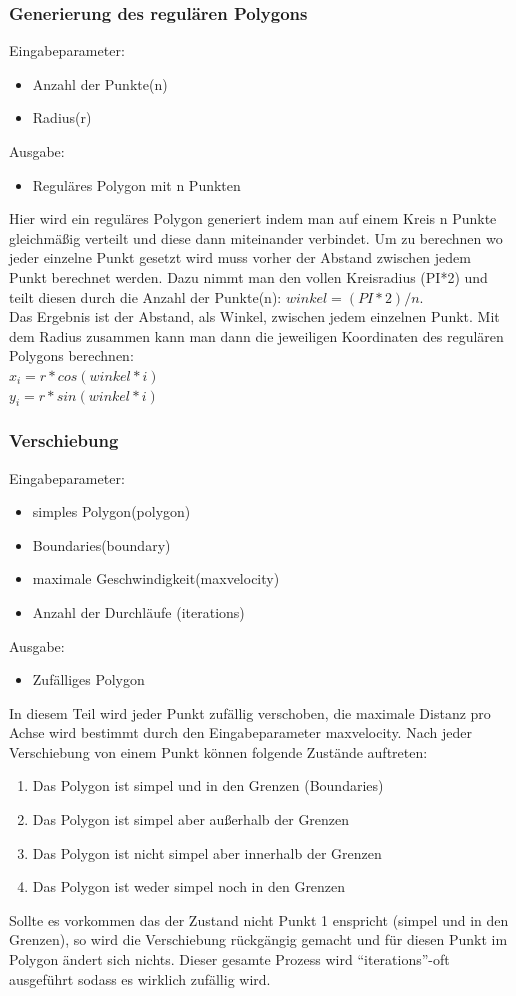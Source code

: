\subsubsection{Generierung des regulären Polygons}
Eingabeparameter: 
\begin{itemize}
	\item Anzahl der Punkte(n)
	\item Radius(r)
\end{itemize}
Ausgabe:
\begin{itemize} 
	\item Reguläres Polygon mit n Punkten
\end{itemize}
Hier wird ein reguläres Polygon generiert indem man auf einem Kreis n Punkte gleichmäßig verteilt und diese dann miteinander verbindet. Um zu berechnen wo jeder einzelne Punkt gesetzt wird muss vorher der Abstand zwischen jedem Punkt berechnet werden. Dazu nimmt man den vollen Kreisradius (PI*2) und teilt diesen durch die Anzahl der Punkte(n): $winkel = (PI * 2) / n$.\\ 
Das Ergebnis ist der Abstand, als Winkel, zwischen jedem einzelnen Punkt.
Mit dem Radius zusammen kann man dann die jeweiligen Koordinaten des regulären Polygons berechnen:\\
$x_i = r * cos(winkel * i)$\\
$y_i = r * sin(winkel * i)$

\subsubsection{Verschiebung}
Eingabeparameter: 
\begin{itemize}
	\item simples Polygon(polygon)
	\item Boundaries(boundary)
	\item maximale Geschwindigkeit(maxvelocity)
	\item Anzahl der Durchläufe (iterations)
\end{itemize}
Ausgabe:
\begin{itemize}
	\item Zufälliges Polygon
\end{itemize}
In diesem Teil wird jeder Punkt zufällig verschoben, die maximale Distanz pro Achse wird bestimmt durch den Eingabeparameter maxvelocity. Nach jeder Verschiebung von einem Punkt können folgende Zustände auftreten:
\begin{enumerate}
	\item Das Polygon ist simpel und in den Grenzen (Boundaries)
	\item Das Polygon ist simpel aber außerhalb der Grenzen
	\item Das Polygon ist nicht simpel aber innerhalb der Grenzen
	\item Das Polygon ist weder simpel noch in den Grenzen
\end{enumerate}
Sollte es vorkommen das der Zustand nicht Punkt 1 enspricht (simpel und in den Grenzen), so wird die Verschiebung rückgängig gemacht und für diesen Punkt im Polygon ändert sich nichts.
Dieser gesamte Prozess wird \enquote{iterations}-oft ausgeführt sodass es wirklich zufällig wird.

